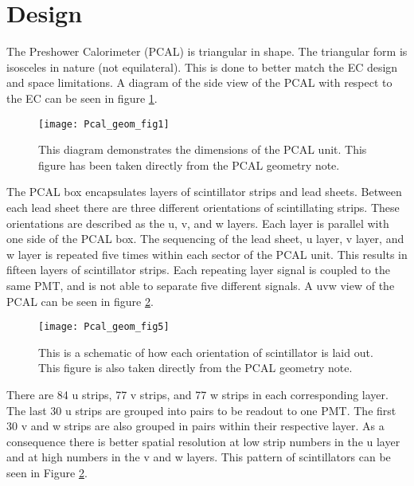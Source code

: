 \section{Design}
The Preshower Calorimeter (PCAL) is triangular in shape. 
The triangular form is isosceles in nature (not equilateral). This is done to better match the EC design and space limitations.
A diagram of the side view of the PCAL with respect to the EC can be seen in figure \ref{fig:geomfig1}. 

\begin{figure}[h]
    \centering
    \texttt{[image: Pcal\_geom\_fig1]}
    \caption{This diagram demonstrates the dimensions of the PCAL unit. This figure has been taken directly from the PCAL geometry note\cite{bib:geomnote}.}
    \label{fig:geomfig1}
\end{figure}

The PCAL box encapsulates layers of scintillator strips and lead sheets. 
Between each lead sheet there are three different orientations of scintillating strips. 
These orientations are described as the u, v, and w layers. 
Each layer is parallel with one side of the PCAL box. 
The sequencing of the lead sheet, u layer, v layer, and w layer is repeated five times within each sector of the PCAL unit. 
This results in fifteen layers of scintillator strips.
Each repeating layer signal is coupled to the same PMT, and  is not able to separate five different signals. 
A uvw view of the PCAL can be seen in figure \ref{fig:geomfig5}.


\begin{figure}[h]
    \centering
    \texttt{[image: Pcal\_geom\_fig5]}
    \caption{This is a schematic of how each orientation of scintillator is laid out. This figure is also taken directly from the PCAL geometry note\cite{bib:geomnote}.}
    \label{fig:geomfig5}
\end{figure}

There are 84 u strips, 77 v strips, and 77 w strips in each corresponding layer. 
The last 30 u strips are grouped into pairs to be readout to one PMT. 
The first 30 v and w strips are also grouped in pairs within their respective layer.
As a consequence there is better spatial resolution at low strip numbers in the u layer and at high numbers in the v and w layers. 
This pattern of scintillators can be seen in Figure \ref{fig:geomfig5}.





